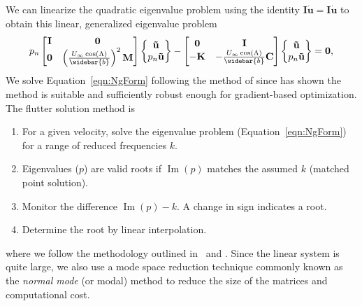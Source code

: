 \documentclass[10pt]{article}
\newcommand{\mbf}[1]{\mathbf{#1}}
\newcommand{\be}{\begin{eqnarray}}
\newcommand{\ee}{\end{eqnarray}}
\newcommand{\Uinf}{U_{\infty}}
\renewcommand{\Im}{\operatorname{Im}}
\begin{document}
We can linearize the quadratic eigenvalue problem using the identity $\mbf{I}\dot{\mbf{u}} = \mbf{I}\dot{\mbf{u}}$ to obtain this linear, generalized eigenvalue problem
%
\be
\label{eqn:NgForm}
p_n
\begin{bmatrix}
    \mbf{I} & \mbf{0}                                                         \\
    \mbf{0} & \left( \frac{\Uinf\cos(\Lambda)}{\widebar{b}} \right)^2 \mbf{M}
\end{bmatrix}
\left\{
\begin{matrix}
    \mbf{\tilde{u}} \\
    p_n\mbf{\tilde{u}}
\end{matrix}
\right\}
-
\begin{bmatrix}
    \mbf{0}  & \mbf{I}                                         \\
    -\mbf{K} & - \frac{\Uinf\cos(\Lambda)}{\widebar{b}}\mbf{C}
\end{bmatrix}
\left\{
\begin{matrix}
    \mbf{\tilde{u}} \\
    p_n\mbf{\tilde{u}}
\end{matrix}
\right\}
=
\mbf{0},
\ee
We solve Equation~\eqref{eqn:NgForm} following the method of \citet{Zyl2001a} since \citet{Jonsson2020b} has shown the method is suitable and sufficiently robust enough for gradient-based optimization.
The flutter solution method is
\begin{enumerate}
    \item For a given velocity, solve the eigenvalue problem (Equation~\eqref{eqn:NgForm}) for a range of reduced frequencies $k$.
    \item Eigenvalues ($p$) are valid roots if $\Im(p)$ matches the assumed $k$ (matched point solution).
    \item Monitor the difference $\Im(p) - k$. A change in sign indicates a root.
    \item Determine the root by linear interpolation.
\end{enumerate}
where we follow the methodology outlined in~\citet{Jonsson2019a} and \citet[Ch. 3]{Jonsson2020b}.
Since the linear system is quite large, we also use a mode space reduction technique commonly known as the \emph{normal mode} (or modal) method to reduce the size of the matrices and computational cost.
\end{document}
